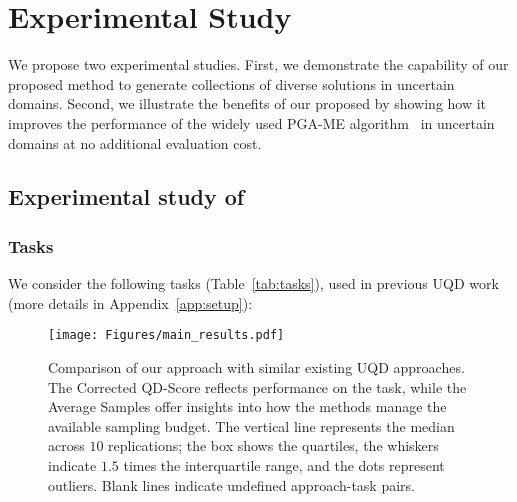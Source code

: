 \section{Experimental Study}

We propose two experimental studies. First, we demonstrate the capability of our proposed \name{} method to generate collections of diverse solutions in uncertain domains. Second, we illustrate the benefits of our proposed \framework{} by showing how it improves the performance of the widely used PGA-ME algorithm~\cite{nilsson2021policy} in uncertain domains at no additional evaluation cost.

\subsection{Experimental study of \Longname{}} \label{sec:results_algo}




\subsubsection{Tasks}
We consider the following tasks (Table~\ref{tab:tasks}), used in previous UQD work~\cite{flageat2023uncertain, flageat2024exploring, grillotti2023don} (more details in Appendix~\ref{app:setup}):





\begin{figure*}[t!]
  \centering
  \texttt{[image: Figures/main\_results.pdf]}
  \caption{
    Comparison of our \name{} approach with similar existing UQD approaches. The Corrected QD-Score reflects performance on the task, while the Average Samples offer insights into how the methods manage the available sampling budget. The vertical line represents the median across $10$ replications; the box shows the quartiles, the whiskers indicate $1.5$ times the interquartile range, and the dots represent outliers. Blank lines indicate undefined approach-task pairs.
  }
  \label{fig:main_results}
\end{figure*}


